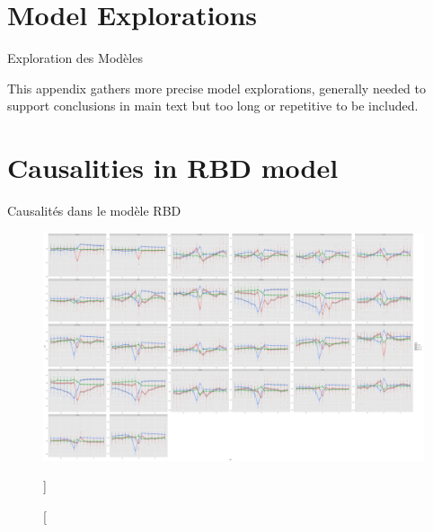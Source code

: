 


\section{Model Explorations}{Exploration des Modèles} %


This appendix gathers more precise model explorations, generally needed to support conclusions in main text but too long or repetitive to be included.






\section{Causalities in RBD model}{Causalités dans le modèle RBD}



\begin{figure}
\includegraphics[height=\textwidth,angle=90]{Figures/SynthRBD/laggedcorrs_facet.png}
\caption[][]{}{}
\end{figure}




